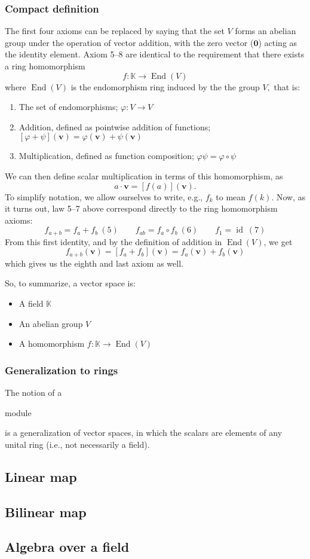 \documentclass{article}
\DeclareMathOperator{\End}{End}
\DeclareMathOperator{\id}{id}
\newenvironment{itemized}{ 
\begin{itemize}
\setlength{\itemsep}{0pt}
\setlength{\parskip}{0pt}
\setlength{\parsep}{0pt}     
}{\end{itemize}}
\newenvironment{enumerated}{ 
\begin{enumerate}
\setlength{\itemsep}{0pt}
\setlength{\parskip}{0pt}
\setlength{\parsep}{0pt}     
}{\end{enumerate}}
\renewcommand{\vec}[1]{\mathbf{#1}}
\begin{document}
\subsubsection*{Compact definition}

The first four axioms can be replaced by saying that the set $V$ forms an abelian group under the operation of vector addition, with the zero vector ($\vec{0}$) acting as the identity element.
Axiom 5--8 are identical to the requirement that there exists a ring homomorphism
$$ f : \mathbb{K} \rightarrow \End(V) $$
where $\End(V)$ is the endomorphism ring induced by the the group $V,$ that is:
\begin{enumerated}
  \item The set of endomorphisms; $\varphi : V \rightarrow V$
  \item Addition, defined as pointwise addition of functions; $ \left[\varphi + \psi\right](\vec{v}) = \varphi(\vec{v}) + \psi(\vec{v})$
  \item Multiplication, defined as function composition; $ \varphi\psi = \varphi \circ \psi$
\end{enumerated}
We can then define scalar multiplication in terms of this homomorphism, as
$$ a \cdot \vec{v} = [f(a)](\vec{v}). $$
To simplify notation, we allow ourselves to write, e.g., $f_k$ to mean $f(k)$. 
Now, as it turns out, law 5--7 above correspond directly to the ring homomorphism axioms:
$$
f_{a + b} = f_a + f_b \ (5) \quad \quad 
f_{ab} = f_a \circ f_b \ (6) \quad \quad 
f_1 = \id \ (7)
$$
From this first identity, and by the definition of addition in $\End(V)$, we get 
$$ f_{a + b}(\vec{v}) = [f_a + f_b](\vec{v}) = f_a(\vec{v}) + f_b(\vec{v}) $$
which gives us the eighth and last axiom as well.

So, to summarize, a vector space is:
\begin{itemized}
  \item A field $\mathbb{K}$ 
  \item An abelian group $V$
  \item A homomorphism $f : \mathbb{K} \rightarrow \End(V)$
\end{itemized}

\subsubsection*{Generalization to rings}
The notion of a \begin{em}module\end{em} is a generalization of vector spaces, in which the scalars are elements of any unital ring (i.e., not necessarily a field).

\subsection*{Linear map}

\subsection*{Bilinear map}

\subsection*{Algebra over a field}
\end{document}
